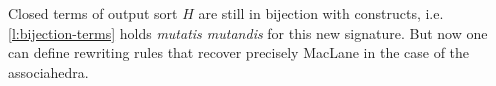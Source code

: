 Closed terms of output sort $H$ are still in bijection with constructs, i.e. \cref{l:bijection-terms} holds \emph{mutatis mutandis} for this new signature. 
But now one can define rewriting rules that recover precisely MacLane in the case of the associahedra. 







